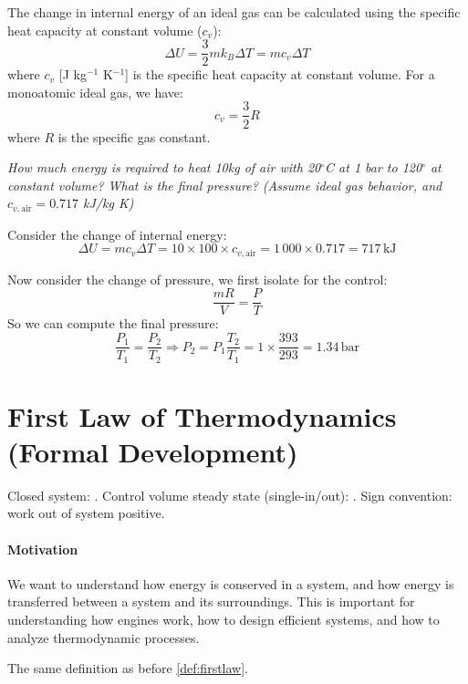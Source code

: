 \documentclass[11pt]{report}
\begin{document}
\begin{definition}
    The change in internal energy of an ideal gas can be calculated using the specific heat capacity at constant volume ($c_v$):
    \begin{equation}
        \Delta U = \frac{3}{2} mk_B \Delta T = m c_v \Delta T
    \end{equation}
    where $c_v$ [J kg$^{-1}$ K$^{-1}$] is the specific heat capacity at constant volume. For a monoatomic ideal gas, we have:
    \begin{equation}
        c_v = \frac{3}{2} R
    \end{equation}
    where $R$ is the specific gas constant.
\end{definition}

\begin{example}
    \textit{How much energy is required to heat 10kg of air with 20$^\circ$C at 1 bar to 120$^\circ$ at constant volume? What is the final pressure? (Assume ideal gas behavior, and $c_{v, \text{air}} = 0.717$ kJ/kg K)}

    Consider the change of internal energy:
    $$
        \Delta U = m c_v \Delta T = 10 \times 100 \times c_{v, \text{air}} = 1\,000 \times 0.717 = 717\, \text{kJ}
    $$

    Now consider the change of pressure, we first isolate for the control:
    $$
        \frac{mR}{V} = \frac{P}{T}
    $$
    So we can compute the final pressure:
    $$
        \frac{P_1}{T_1} = \frac{P_2}{T_2} \Rightarrow P_2 = P_1 \frac{T_2}{T_1} = 1 \times \frac{393}{293} = 1.34\, \text{bar}
    $$
\end{example}

\section{First Law of Thermodynamics (Formal Development)}
\begin{review}
Closed system: . Control volume steady state (single-in/out): . Sign convention: work out of system positive.
\end{review}
\begin{shaded}
\paragraph{Motivation} We want to understand how energy is conserved in a system, and how energy is transferred between a system and its surroundings. This is important for understanding how engines work, how to design efficient systems, and how to analyze thermodynamic processes.
\end{shaded}  
The same definition as before \ref{def:firstlaw}.
\end{document}
